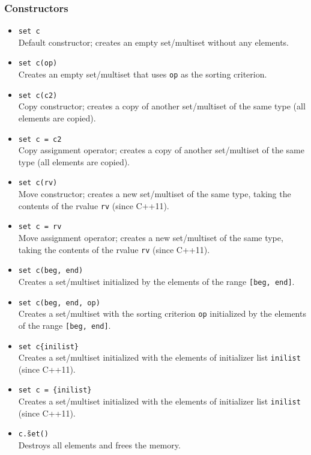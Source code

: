 \documentclass{report}
\begin{document}
\subsubsection{Constructors}
\bigbreak \noindent \bigbreak \noindent 
\begin{itemize}
    \item \texttt{set c} \\
    Default constructor; creates an empty set/multiset without any elements.
    
    \item \texttt{set c(op)} \\
    Creates an empty set/multiset that uses \texttt{op} as the sorting criterion.
    
    \item \texttt{set c(c2)} \\
    Copy constructor; creates a copy of another set/multiset of the same type (all elements are copied).
    
    \item \texttt{set c = c2} \\
    Copy assignment operator; creates a copy of another set/multiset of the same type (all elements are copied).
    
    \item \texttt{set c(rv)} \\
    Move constructor; creates a new set/multiset of the same type, taking the contents of the rvalue \texttt{rv} (since C++11).
    
    \item \texttt{set c = rv} \\
    Move assignment operator; creates a new set/multiset of the same type, taking the contents of the rvalue \texttt{rv} (since C++11).
    
    \item \texttt{set c(beg, end)} \\
    Creates a set/multiset initialized by the elements of the range \texttt{[beg, end]}.
    
    \item \texttt{set c(beg, end, op)} \\
    Creates a set/multiset with the sorting criterion \texttt{op} initialized by the elements of the range \texttt{[beg, end]}.
    
    \item \texttt{set c\{inilist\}} \\
    Creates a set/multiset initialized with the elements of initializer list \texttt{inilist} (since C++11).
    
    \item \texttt{set c = \{inilist\}} \\
    Creates a set/multiset initialized with the elements of initializer list \texttt{inilist} (since C++11).
    
    \item \texttt{c.\~set()} \\
    Destroys all elements and frees the memory.
\end{itemize}
\end{document}
